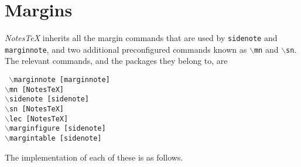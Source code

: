 \documentclass[10pt]{article}
\begin{document}

\section{Margins}\label{Sec:Margins}%
\textit{NotesTeX} inherits all the margin commands that are used by \texttt{sidenote} and \texttt{marginnote}, and two additional pre\-configured commands known as \texttt{\( \backslash \)mn} and \texttt{\( \backslash \)sn}. The relevant commands, and the packages they belong to, are
\begin{center}
	\begin{multicols}{2}
		\noindent\texttt{
		\( \backslash \)marginnote~[marginnote]\\
		\( \backslash \)mn~[NotesTeX]\\
		\( \backslash \)sidenote~[sidenote]\\
		\( \backslash \)sn~[NotesTeX]\\
		\( \backslash \)lec~[NotesTeX]\\
		\( \backslash \)marginfigure~[sidenote]\\
		\( \backslash \)margintable~[sidenote]\\
		}
	\end{multicols}
\end{center}
The implementation of each of these is as follows.
\end{document}
